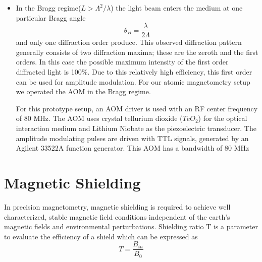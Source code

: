 \documentclass[12pt]{report}
\begin{document}
\begin{itemize}
\item In the Bragg regime($L > \Lambda^2/\lambda$) the light beam enters the medium at one particular Bragg angle 
\begin{equation}
\theta_B=\frac{\lambda}{2\Lambda}
\end{equation}                                 
and only one diffraction order produce. This observed diffraction pattern generally consists of two diffraction maxima; these are the zeroth and the first orders. In this case the possible maximum intensity of the first order diffracted light is 100\%. Due to this relatively high efficiency, this first order can be used for amplitude modulation. For our atomic magnetometry setup we operated the AOM in the Bragg regime.

For this prototype setup, an AOM driver is used with an RF center frequency of 80 MHz. The AOM uses crystal tellurium dioxide ($TeO_2$) for the optical interaction medium and Lithium Niobate as the piezoelectric transducer. The amplitude modulating pulses are driven with TTL signals, generated by an Agilent 33522A function generator. This AOM has a bandwidth of 80 MHz\\


\end{itemize} 
\section{Magnetic Shielding}
In precision magnetometry, magnetic shielding is required to achieve well characterized, stable magnetic field conditions independent of the earth’s magnetic fields and environmental perturbations. Shielding ratio T is a parameter to evaluate the efficiency of a shield which can be expressed as
\begin{equation}
 T = \frac{B_{in} }{B_0} 
\end{equation}
\end{document}
